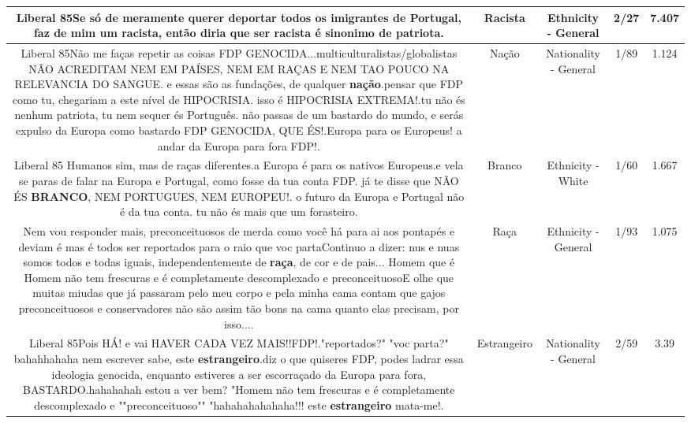 \documentclass[11pt]{article}
\newlength\mylength
\begin{document}
\begin{center}
\begin{longtable}{|C{.65\mylength}|C{.30\mylength}|C{.12\mylength}|C{.12\mylength}|C{.12\mylength}|}
  \small Liberal 85Se só de meramente querer deportar todos os imigrantes de Portugal, faz de mim um \textbf{racista}, então diria que ser \textbf{racista} é sinonimo de patriota.\normalsize   & Racista & Ethnicity - General & 2/27 & 7.407 \\  \hline
  \small Liberal 85Não me faças repetir as coisas FDP GENOCIDA...multiculturalistas/globalistas NÃO ACREDITAM NEM EM PAÍSES, NEM EM RAÇAS E NEM TAO POUCO NA RELEVANCIA DO SANGUE. e essas são as fundações, de qualquer \textbf{nação}.pensar que FDP como tu, chegariam a este nível de HIPOCRISIA. isso é HIPOCRISIA EXTREMA!.tu não és nenhum patriota, tu nem sequer és Português. não passas de um bastardo do mundo, e serás expulso da Europa como bastardo FDP GENOCIDA, QUE ÉS!.Europa para os Europeus! a andar da Europa para fora FDP!.\normalsize   & Nação & Nationality - General & 1/89 & 1.124 \\  \hline
  \small Liberal 85 Humanos sim, mas de raças diferentes.a Europa é para os nativos Europeus.e vela se paras de falar na Europa e Portugal, como fosse da tua conta FDP. já te disse que NÃO ÉS \textbf{BRANCO}, NEM PORTUGUES, NEM EUROPEU!. o futuro da Europa e Portugal não é da tua conta. tu não és mais que um forasteiro.\normalsize   & Branco & Ethnicity - White & 1/60 & 1.667 \\  \hline
  \small Nem vou responder mais, preconceituosos de merda como você há para ai aos pontapés e deviam é mas é todos ser reportados para o raio que voc partaContinuo a dizer: nus e nuas somos todos e todas iguais, independentemente de \textbf{raça}, de cor e de pais... Homem que é Homem não tem frescuras e é completamente descomplexado e preconceituosoE olhe que muitas miudas que já passaram pelo meu corpo e pela minha cama contam que gajos preconceituosos e conservadores não são assim tão bons na cama quanto elas precisam, por isso....\normalsize   & Raça & Ethnicity - General & 1/93 & 1.075 \\  \hline
  \small Liberal 85Pois HÁ! e vai HAVER CADA VEZ MAIS!!FDP!."reportados?" "voc parta?" bahahhahaha nem escrever sabe, este \textbf{estrangeiro}.diz o que quiseres FDP, podes ladrar essa ideologia genocida, enquanto estiveres a ser escorraçado da Europa para fora, BASTARDO.hahahahah estou a ver bem? "Homem não tem frescuras e é completamente descomplexado e ""preconceituoso"" "hahahahahahaha!!! este \textbf{estrangeiro} mata-me!.\normalsize   & Estrangeiro & Nationality - General & 2/59 & 3.39 \\  \hline

\end{longtable}
\end{center}
\end{document}
